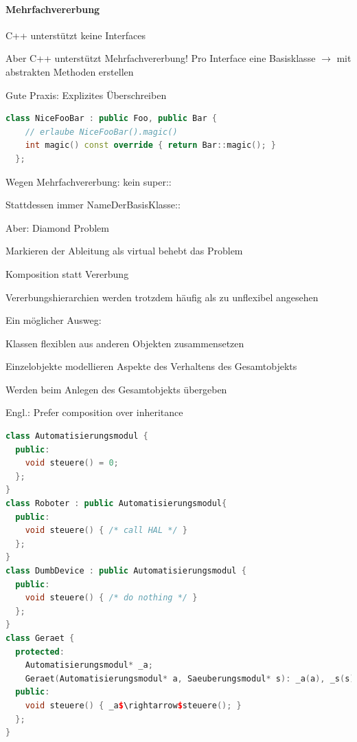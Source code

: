 \documentclass[10pt]{article}
\begin{document}
\paragraph{Mehrfachvererbung}

\begin{itemize*}
  \item C++ unterstützt keine Interfaces
  \item Aber C++ unterstützt Mehrfachvererbung! Pro Interface eine Basisklasse $\rightarrow$ mit abstrakten Methoden erstellen
  \item Gute Praxis: Explizites Überschreiben
  \begin{lstlisting}[language=C++]
  class NiceFooBar : public Foo, public Bar {
    // erlaube NiceFooBar().magic()
    int magic() const override { return Bar::magic(); }
  };
  \end{lstlisting}
  \begin{itemize*}
    \item Wegen Mehrfachvererbung: kein super::
    \item Stattdessen immer NameDerBasisKlasse::
  \end{itemize*}
  \item Aber: Diamond Problem
  \begin{itemize*}
    \item Markieren der Ableitung als virtual behebt das Problem
  \end{itemize*}
\end{itemize*}

Komposition statt Vererbung
\begin{itemize*}
  \item Vererbungshierarchien werden trotzdem häufig als zu unflexibel angesehen
  \item Ein möglicher Ausweg:
  \begin{itemize*}
    \item Klassen flexiblen aus anderen Objekten zusammensetzen
    \item Einzelobjekte modellieren Aspekte des Verhaltens des Gesamtobjekts
    \item Werden beim Anlegen des Gesamtobjekts übergeben
  \end{itemize*}
  \item Engl.: Prefer composition over inheritance
\end{itemize*}

\begin{lstlisting}[language=C++]
class Automatisierungsmodul {
  public:
    void steuere() = 0;
  };
}
class Roboter : public Automatisierungsmodul{
  public:
    void steuere() { /* call HAL */ }
  };
}
class DumbDevice : public Automatisierungsmodul {
  public:
    void steuere() { /* do nothing */ }
  };
}
class Geraet {
  protected:
    Automatisierungsmodul* _a;
    Geraet(Automatisierungsmodul* a, Saeuberungsmodul* s): _a(a), _s(s) {}
  public:
    void steuere() { _a$\rightarrow$steuere(); }
  };
}
\end{lstlisting}
\end{document}
